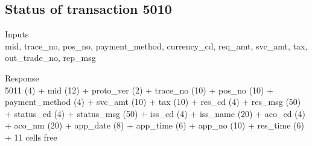 \documentclass[12pt]{article}
\begin{document}
\subsection{Status of transaction 5010}
    \begin{description}
        \item Inputs \\
            mid, trace\_no, pos\_no, payment\_method, 
            currency\_cd, req\_amt, svc\_amt, 
            tax, out\_trade\_no, rep\_msg\\
        \item Response \\
        5011 (4) + mid (12) + proto\_ver (2) 
        + trace\_no (10) + pos\_no (10) + payment\_method (4) 
        + svc\_amt (10) + tax (10) + res\_cd (4)
        + res\_msg (50) + status\_cd (4) + status\_msg (50)
        + iss\_cd (4) + iss\_name (20) + aco\_cd (4)
        + aco\_nm (20) + app\_date (8) + app\_time (6)
        + app\_no (10) + res\_time (6) + 11 cells free
    \end{description}




\begin{thebibliography}{9}
        
\end{thebibliography}
\end{document}
